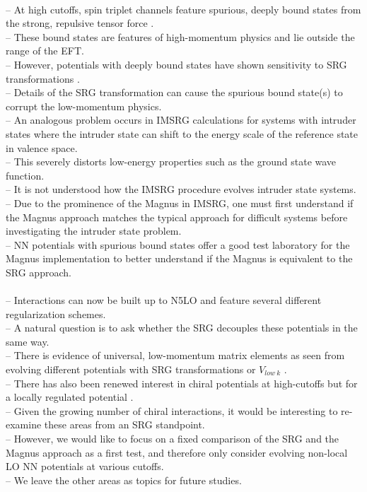 \documentclass[preprintnumbers,floatfix,aps,prc,preprint,nofootinbib]{revtex4-1}
\begin{document}
\\
-- At high cutoffs, spin triplet channels feature spurious, deeply bound states from the strong, repulsive tensor force \cite{Nogga:2005hy}.
\\
-- These bound states are features of high-momentum physics and lie outside the range of the EFT.
\\
-- However, potentials with deeply bound states have shown sensitivity to SRG transformations \cite{Glazek:2008pg, Wendt:2011qj}.
\\
-- Details of the SRG transformation can cause the spurious bound state(s) to corrupt the low-momentum physics.
\\
-- An analogous problem occurs in IMSRG calculations for systems with intruder states where the intruder state can shift to the energy scale of the reference state in valence space.
\\
-- This severely distorts low-energy properties such as the ground state wave function.
\\
-- It is not understood how the IMSRG procedure evolves intruder state systems.
\\
-- Due to the prominence of the Magnus in IMSRG, one must first understand if the Magnus approach matches the typical approach for difficult systems before investigating the intruder state problem.
\\
-- NN potentials with spurious bound states offer a good test laboratory for the Magnus implementation to better understand if the Magnus is equivalent to the SRG approach. 
\\


\\
-- Interactions can now be built up to N5LO and feature several different regularization schemes.
\\
-- A natural question is to ask whether the SRG decouples these potentials in the same way.
\\
-- There is evidence of universal, low-momentum matrix elements as seen from evolving different potentials with SRG transformations or $V_{low~k}$ \cite{Dainton:2013axa}.
\\
-- There has also been renewed interest in chiral potentials at high-cutoffs but for a locally regulated potential \cite{Tews:2018sbi}.
\\
-- Given the growing number of chiral interactions, it would be interesting to re-examine these areas from an SRG standpoint.
\\
-- However, we would like to focus on a fixed comparison of the SRG and the Magnus approach as a first test, and therefore only consider evolving non-local LO NN potentials at various cutoffs.
\\
-- We leave the other areas as topics for future studies.
\\
\end{document}
